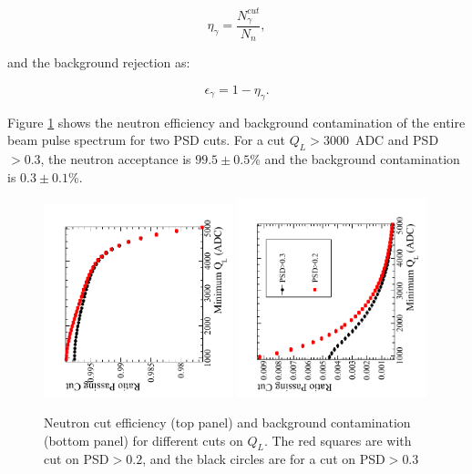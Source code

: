 \documentclass[letter,twocolumn,preprint,3p]{elsarticle}
\begin{document}
\begin{equation}
\eta_{\gamma}= \frac{N_{\gamma}^{cut}}{N_n},
\end{equation}

\noindent and the background rejection as:

\begin{equation}
\epsilon_{\gamma} = 1 - \eta_{\gamma}.
\end{equation}

\noindent Figure \ref{fig:detectionEff} shows the neutron efficiency
and background contamination of the entire beam pulse spectrum for two
PSD cuts.  For a cut $Q_L>3000$~ADC and PSD$>0.3$, the neutron
acceptance is $99.5\pm0.5$\% and the background contamination
is $0.3\pm0.1$\%.


\begin{figure}[!htpb]
\centering \includegraphics[width =0.49\textwidth, angle=-90]{figures/neutroneff.pdf}
\centering \includegraphics[width =0.49\textwidth, angle=-90]{figures/backgroundconta.pdf}
\caption{ Neutron cut efficiency (top panel) and background
  contamination (bottom panel) for different cuts on $Q_L$.  The red
  squares are with cut on PSD$>0.2$, and the black circles are for a
  cut on PSD$>0.3$ }
\label{fig:detectionEff}
\end{figure}
\end{document}

